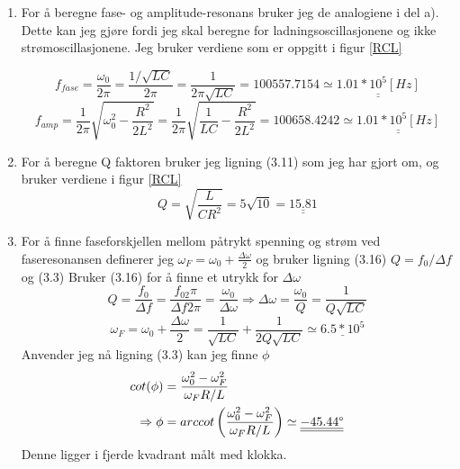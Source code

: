 \documentclass[a4paper,12pt,norsk]{article}
\newcommand{\uu}{\underline}
\begin{document}
\begin{enumerate}[label=(\alph*)]
\item
For å beregne fase- og amplitude-resonans bruker jeg de analogiene i del a). Dette kan jeg gjøre fordi jeg skal beregne for ladningsoscillasjonene og ikke strømoscillasjonene. Jeg bruker verdiene som er oppgitt i figur \vref{RCL}

$$
f_{fase} = \frac{\omega_0}{2\pi} = \frac{1/\sqrt{LC}}{2\pi} = \frac{1}{2\pi \sqrt{LC}} = 100557.7154 \simeq \uu{\uu{1.01*10^5[Hz]}}
$$
$$
f_{amp} = \frac{1}{2\pi}\sqrt{\omega_0^2-\frac{R^2}{2L^2}} = \frac{1}{2\pi}\sqrt{\frac{1}{LC}-\frac{R^2}{2L^2}} = 100658.4242 \simeq \uu{\uu{1.01*10^5[Hz]}}
$$

\item
For å beregne Q faktoren bruker jeg ligning (3.11) som jeg har gjort om, og bruker verdiene i figur \vref{RCL}
$$
Q = \sqrt{\frac{L}{CR^2}} = 5\sqrt{10} = \uu{\uu{15.81}}
$$

\item
For å finne faseforskjellen mellom påtrykt spenning og strøm ved faseresonansen definerer jeg $\omega_F = \omega_0 + \frac{\Delta \omega}{2}$ og bruker ligning (3.16) $Q = f_0/\Delta f$ og (3.3)
Bruker (3.16) for å finne et utrykk for $\Delta \omega$
$$
Q = \frac{f_0}{\Delta f} =  \frac{f_02\pi}{\Delta f 2\pi} = \frac{\omega_0}{\Delta\omega} \Rightarrow \Delta \omega = \frac{\omega_0}{Q} = \frac{1}{Q\sqrt{LC}}
$$
$$
\omega_F = \omega_0 + \frac{\Delta \omega}{2} = \frac{1}{\sqrt{LC}} + \frac{1}{2Q\sqrt{LC}} \simeq \uu{6.5*10^5}
$$
Anvender jeg nå ligning (3.3) kan jeg finne $\phi$
\begin{align*}
cot(\phi) &= \frac{\omega_0^2- \omega_F^2}{\omega_FR/L} \\ 
\Rightarrow \phi &= arccot\left( \frac{\omega_0^2- \omega_F^2}{\omega_FR/L}\right)\simeq \uu{\uu{-45.44\degree}}\\
\end{align*} 
Denne ligger i fjerde kvadrant målt med klokka.
\end{enumerate}
\end{document}
